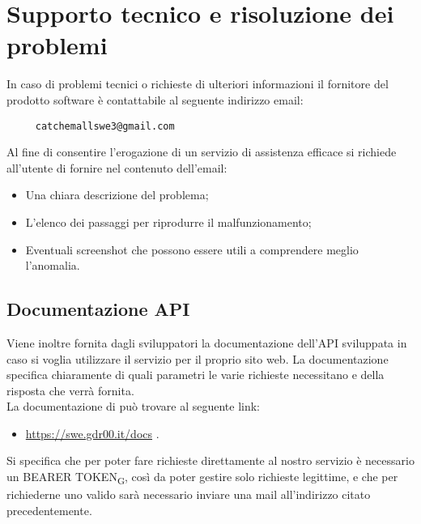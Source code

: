 \section{Supporto tecnico e risoluzione dei problemi}
In caso di problemi tecnici o richieste di ulteriori informazioni il fornitore del prodotto software è contattabile al seguente indirizzo email:
\begin{verbatim}
	 catchemallswe3@gmail.com
\end{verbatim}
 Al fine di consentire l'erogazione di un servizio di assistenza efficace si richiede all'utente di fornire nel contenuto dell'email:
\begin{itemize}
	\item Una chiara descrizione del problema;
	\item L'elenco dei passaggi per riprodurre il malfunzionamento;
    \item Eventuali screenshot che possono essere utili a comprendere meglio l'anomalia.
\end{itemize} 

\subsection{Documentazione API}
Viene inoltre fornita dagli sviluppatori la documentazione dell'API sviluppata in caso si voglia utilizzare il servizio per il proprio sito web. La documentazione specifica chiaramente di quali parametri le varie richieste necessitano e della risposta che verrà fornita.\\
La documentazione di può trovare al seguente link:
\begin{itemize}
	\item \href{https://swe.gdr00.it/docs}{https://swe.gdr00.it/docs} .\\
\end{itemize}
Si specifica che per poter fare richieste direttamente al nostro servizio è necessario un BEARER TOKEN\textsubscript{G}, così da poter gestire solo richieste legittime, e che per richiederne uno valido sarà necessario inviare una mail all'indirizzo citato precedentemente.
